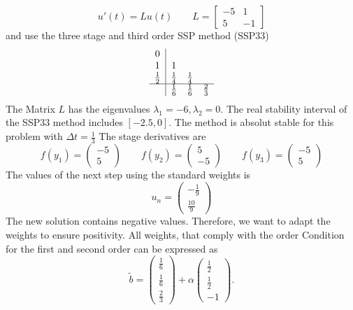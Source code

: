 \documentclass[a4paper]{article}
\numberwithin{equation}{section}
\theoremstyle{plain}
\theoremstyle{definition}
\numberwithin{theorem}{section}
\newcommand{\dt}{{\Delta t}}
\newcommand{\1}{\mathbbm{1}}
\begin{document}
\begin{equation}
u'(t) = L u(t) \qquad L = \left[\begin{matrix}- 5 & 1\\5 & -1\end{matrix}\right] 
\end{equation}
and use the three stage and third order SSP method (SSP33)
\begin{align}
\begin{array}{c|ccc}
0 &  &  & \\
1 & 1 &  & \\
\frac{1}{2} & \frac{1}{4} & \frac{1}{4} & \\
\hline
 & \frac{1}{6} & \frac{1}{6} & \frac{2}{3}\\
\end{array}
\end{align}
The Matrix $L$ has the eigenvalues $\lambda_1 = -6,\lambda_2=0$. The real stability interval of the SSP33 method includes $[-2.5,0]$. The method is absolut stable for this problem with $\dt = \frac{1}{3}$
The stage derivatives are
\begin{equation}
f(y_1)=\left(\begin{matrix}-5\\5\end{matrix}\right)\qquad f(y_2)=\left(\begin{matrix}5\\-5\end{matrix}\right)\qquad f(y_3)=\left(\begin{matrix}-5\\5\end{matrix}\right)\end{equation}
The values of the next step using the standard weights is
\begin{equation}
u_n=\left(\begin{matrix}- \frac{1}{9}\\\frac{10}{9}\end{matrix}\right)
\end{equation}
The new solution contains negative values. 
Therefore, we want to adapt the weights to ensure positivity. 
All weights, that comply with the order Condition for the first and second order can be expressed as
\begin{equation}
\tilde b=\left(\begin{matrix}\frac{1}{6}\\\frac{1}{6}\\\frac{2}{3}\end{matrix}\right)+\alpha \left(\begin{matrix}\frac{1}{2}\\\frac{1}{2}\\-1\end{matrix}\right).
\end{equation}
\end{document}
